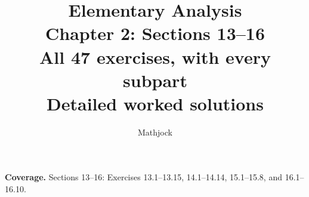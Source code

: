
\title{\textbf{Elementary Analysis}\\[0.3em]
Chapter 2: Sections 13--16\\[0.4em]
\large All 47 exercises, with every subpart\\
Detailed worked solutions}
\author{Mathjock}
\date{}

\maketitle
\bookinfo
\par\textbf{Coverage.} Sections 13--16: Exercises 13.1--13.15, 14.1--14.14, 15.1--15.8, and 16.1--16.10.
\tableofcontents
\clearpage
\setcounter{section}{12}

\clearpage

\clearpage

\clearpage


